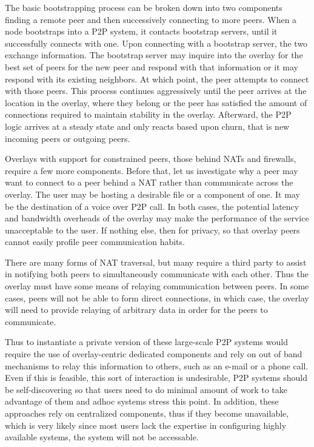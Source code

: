 \documentclass[conference]{IEEEtran}
\begin{document}
The basic bootstrapping process can be broken down into two components finding
a remote peer and then successively connecting to more peers.  When a node
bootstraps into a P2P system, it contacts bootstrap servers, until it
successfully connects with one.  Upon connecting with a bootstrap server, the
two exchange information.  The bootstrap server may inquire into the overlay
for the best set of peers for the new peer and respond with that information or
it may respond with its existing neighbors.  At which point, the peer attempts
to connect with those peers.  This process continues aggressively until the
peer arrives at the location in the overlay, where they belong or the peer has
satisfied the amount of connections required to maintain stability in the
overlay.  Afterward, the P2P logic arrives at a steady state and only reacts
based upon churn, that is new incoming peers or outgoing peers.

Overlays with support for constrained peers, those behind NATs and firewalls,
require a few more components.  Before that, let us investigate why a peer may
want to connect to a peer behind a NAT rather than communicate across the
overlay.  The user may be hosting a desirable file or a component of one. It
may be the destination of a voice over P2P call.  In both cases, the potential
latency and bandwidth overheads of the overlay may make the performance of the
service unacceptable to the user.  If nothing else, then for privacy, so that
overlay peers cannot easily profile peer communication habits.

There are many forms of NAT traversal, but many require a third party to assist
in notifying both peers to simultaneously communicate with each other.  Thus
the overlay must have some means of relaying communication between peers.  In
some cases, peers will not be able to form direct connections, in which case,
the overlay will need to provide relaying of arbitrary data in order for the
peers to communicate.

Thus to instantiate a private version of these large-scale P2P systems would
require the use of overlay-centric dedicated components and rely on out of band
mechanisms to relay this information to others, such as an e-mail or a phone
call.  Even if this is feasible, this sort of interaction is undesirable, P2P
systems should be self-discovering so that users need to do minimal amount of
work to take advantage of them and adhoc systems stress this point.  In
addition, these approaches rely on centralized components, thus if they become
unavailable, which is very likely since most users lack the expertise in
configuring highly available systems, the system will not be accessable.
\end{document}
